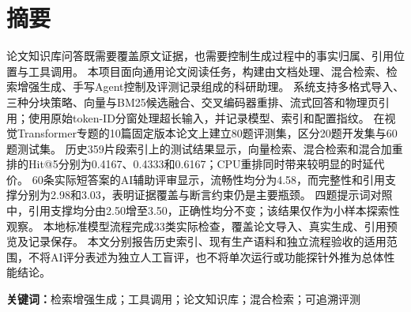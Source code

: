 \documentclass[UTF8,a4paper,zihao=-4,fontset=fandol]{ctexart}
\begin{document}
\hypersetup{pageanchor=true}
\section*{摘要}
论文知识库问答既需要覆盖原文证据，也需要控制生成过程中的事实归属、引用位置与工具调用。
本项目面向通用论文阅读任务，构建由文档处理、混合检索、检索增强生成、手写Agent控制及评测记录组成的科研助理。
系统支持多格式导入、三种分块策略、向量与BM25候选融合、交叉编码器重排、流式回答和物理页引用；使用原始token-ID分窗处理超长输入，并记录模型、索引和配置指纹。
在视觉Transformer专题的10篇固定版本论文上建立80题评测集，区分20题开发集与60题测试集。
历史359片段索引上的测试结果显示，向量检索、混合检索和混合加重排的Hit@5分别为0.4167、0.4333和0.6167；CPU重排同时带来较明显的时延代价。
60条实际短答案的AI辅助评审显示，流畅性均分为4.58，而完整性和引用支撑分别为2.98和3.03，表明证据覆盖与断言约束仍是主要瓶颈。
四题提示词对照中，引用支撑均分由2.50增至3.50，正确性均分不变；该结果仅作为小样本探索性观察。
本地标准模型流程完成33类实际检查，覆盖论文导入、真实生成、引用预览及记录保存。
本文分别报告历史索引、现有生产语料和独立流程验收的适用范围，不将AI评分表述为独立人工盲评，也不将单次运行或功能探针外推为总体性能结论。
\par\noindent\textbf{关键词：}检索增强生成；工具调用；论文知识库；混合检索；可追溯评测

\clearpage
\end{document}
